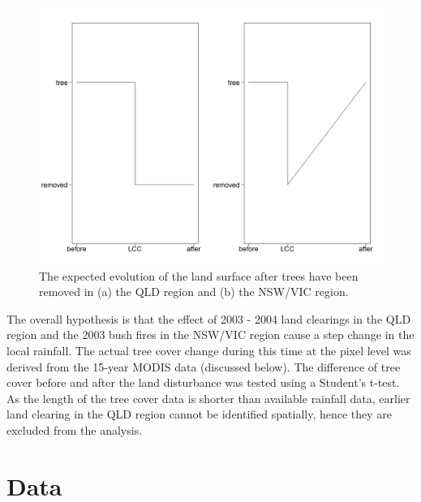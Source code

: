\documentclass[fleqn,10pt,lineno]{wlpeerj} %
\begin{document}
\begin{figure}
\includegraphics[width=0.9\linewidth]{figures/tc_simple} \caption{The expected evolution of the land surface after trees have been removed in (a) the QLD region and (b) the NSW/VIC region.}\label{fig:figure3-tc-simple}
\end{figure}

The overall hypothesis is that the effect of 2003 - 2004 land clearings
in the QLD region and the 2003 bush fires in the NSW/VIC region cause a
step change in the local rainfall. The actual tree cover change during
this time at the pixel level was derived from the 15-year MODIS data
(discussed below). The difference of tree cover before and after the
land disturbance was tested using a Student's t-test. As the length of
the tree cover data is shorter than available rainfall data, earlier
land clearing in the QLD region cannot be identified spatially, hence
they are excluded from the analysis.

\hypertarget{Data}{\section{Data}\label{Data}}
\end{document}
